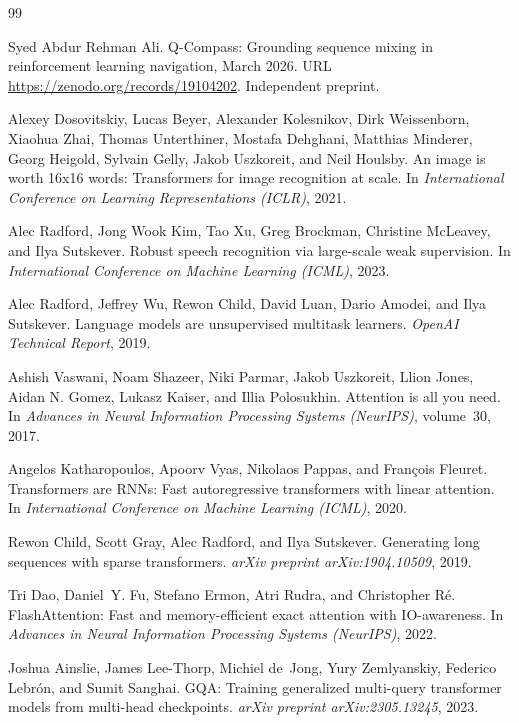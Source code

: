 \begin{thebibliography}{99}

Syed Abdur Rehman Ali.
\newblock Q-Compass: Grounding sequence mixing in reinforcement learning navigation, March 2026.
\newblock URL \url{https://zenodo.org/records/19104202}.
\newblock Independent preprint.

Alexey Dosovitskiy, Lucas Beyer, Alexander Kolesnikov, Dirk Weissenborn, Xiaohua Zhai, Thomas
  Unterthiner, Mostafa Dehghani, Matthias Minderer, Georg Heigold, Sylvain Gelly, Jakob Uszkoreit,
  and Neil Houlsby.
\newblock An image is worth 16x16 words: Transformers for image recognition at scale.
\newblock In \emph{International Conference on Learning Representations (ICLR)}, 2021.

Alec Radford, Jong Wook Kim, Tao Xu, Greg Brockman, Christine McLeavey, and Ilya Sutskever.
\newblock Robust speech recognition via large-scale weak supervision.
\newblock In \emph{International Conference on Machine Learning (ICML)}, 2023.

Alec Radford, Jeffrey Wu, Rewon Child, David Luan, Dario Amodei, and Ilya Sutskever.
\newblock Language models are unsupervised multitask learners.
\newblock \emph{OpenAI Technical Report}, 2019.

Ashish Vaswani, Noam Shazeer, Niki Parmar, Jakob Uszkoreit, Llion Jones, Aidan N. Gomez,
  Lukasz Kaiser, and Illia Polosukhin.
\newblock Attention is all you need.
\newblock In \emph{Advances in Neural Information Processing Systems (NeurIPS)}, volume~30, 2017.

Angelos Katharopoulos, Apoorv Vyas, Nikolaos Pappas, and Fran\c{c}ois Fleuret.
\newblock Transformers are RNNs: Fast autoregressive transformers with linear attention.
\newblock In \emph{International Conference on Machine Learning (ICML)}, 2020.

Rewon Child, Scott Gray, Alec Radford, and Ilya Sutskever.
\newblock Generating long sequences with sparse transformers.
\newblock \emph{arXiv preprint arXiv:1904.10509}, 2019.

Tri Dao, Daniel~Y. Fu, Stefano Ermon, Atri Rudra, and Christopher R\'{e}.
\newblock FlashAttention: Fast and memory-efficient exact attention with IO-awareness.
\newblock In \emph{Advances in Neural Information Processing Systems (NeurIPS)}, 2022.

Joshua Ainslie, James Lee-Thorp, Michiel de~Jong, Yury Zemlyanskiy, Federico Lebr\'{o}n, and Sumit
  Sanghai.
\newblock GQA: Training generalized multi-query transformer models from multi-head checkpoints.
\newblock \emph{arXiv preprint arXiv:2305.13245}, 2023.


\end{thebibliography}

